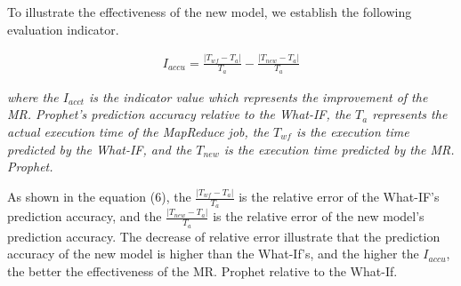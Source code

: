 To illustrate the effectiveness of the new model, we establish the following evaluation indicator.
\begin{small}
\begin{equation}
\begin{split}
I_{accu}=\frac{|T_{wf}-T_a|}{T_a} - \frac{|T_{new}-T_a|}{T_a}
\end{split}
\end{equation}
\end{small}

\emph{where the $I_{acct}$ is the indicator value which represents the improvement of the MR. Prophet's prediction accuracy relative to the What-IF, the $T_a$ represents the actual execution time of the MapReduce job, the $T_{wf}$ is the execution time predicted by the What-IF, and the $T_{new}$ is the execution time predicted by the MR. Prophet.}

As shown in the equation (6), the $\frac{|T_{wf}-T_a|}{T_a}$ is the relative error of the What-IF's prediction accuracy, and the $\frac{|T_{new}-T_a|}{T_a}$ is the relative error of the new model's prediction accuracy. The decrease of relative error illustrate that the prediction accuracy of the new model is higher than the What-If's, and the higher the $I_{accu}$, the better the effectiveness of the MR. Prophet relative to the What-If.

